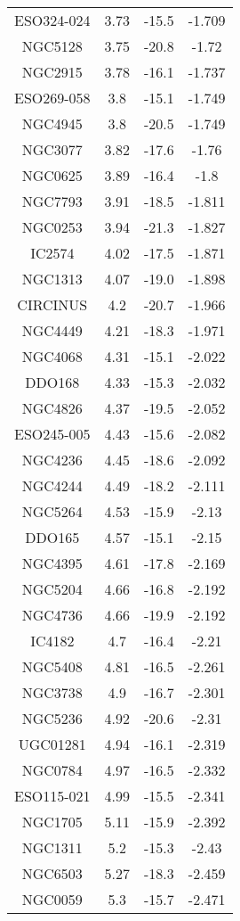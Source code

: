 \begin{table}
\begin{tabular}{cccc}
ESO324-024 & 3.73 & -15.5 & -1.709 \\
NGC5128 & 3.75 & -20.8 & -1.72 \\
NGC2915 & 3.78 & -16.1 & -1.737 \\
ESO269-058 & 3.8 & -15.1 & -1.749 \\
NGC4945 & 3.8 & -20.5 & -1.749 \\
NGC3077 & 3.82 & -17.6 & -1.76 \\
NGC0625 & 3.89 & -16.4 & -1.8 \\
NGC7793 & 3.91 & -18.5 & -1.811 \\
NGC0253 & 3.94 & -21.3 & -1.827 \\
IC2574 & 4.02 & -17.5 & -1.871 \\
NGC1313 & 4.07 & -19.0 & -1.898 \\
CIRCINUS & 4.2 & -20.7 & -1.966 \\
NGC4449 & 4.21 & -18.3 & -1.971 \\
NGC4068 & 4.31 & -15.1 & -2.022 \\
DDO168 & 4.33 & -15.3 & -2.032 \\
NGC4826 & 4.37 & -19.5 & -2.052 \\
ESO245-005 & 4.43 & -15.6 & -2.082 \\
NGC4236 & 4.45 & -18.6 & -2.092 \\
NGC4244 & 4.49 & -18.2 & -2.111 \\
NGC5264 & 4.53 & -15.9 & -2.13 \\
DDO165 & 4.57 & -15.1 & -2.15 \\
NGC4395 & 4.61 & -17.8 & -2.169 \\
NGC5204 & 4.66 & -16.8 & -2.192 \\
NGC4736 & 4.66 & -19.9 & -2.192 \\
IC4182 & 4.7 & -16.4 & -2.21 \\
NGC5408 & 4.81 & -16.5 & -2.261 \\
NGC3738 & 4.9 & -16.7 & -2.301 \\
NGC5236 & 4.92 & -20.6 & -2.31 \\
UGC01281 & 4.94 & -16.1 & -2.319 \\
NGC0784 & 4.97 & -16.5 & -2.332 \\
ESO115-021 & 4.99 & -15.5 & -2.341 \\
NGC1705 & 5.11 & -15.9 & -2.392 \\
NGC1311 & 5.2 & -15.3 & -2.43 \\
NGC6503 & 5.27 & -18.3 & -2.459 \\
NGC0059 & 5.3 & -15.7 & -2.471 \\

\end{tabular}
\end{table}
